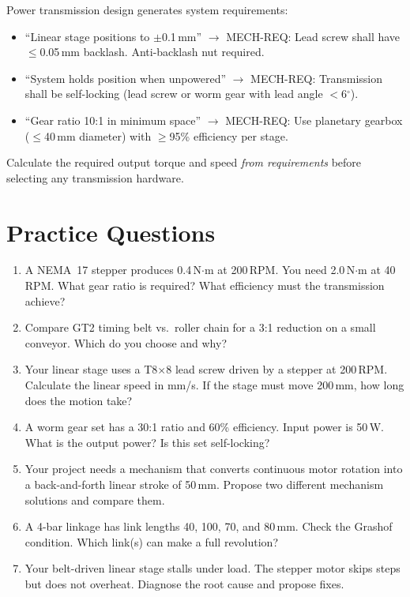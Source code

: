 \documentclass[11pt,letterpaper,twoside,openany]{book}
\providecommand{\ang}[1]{#1\ensuremath{{}^{\circ}}}
\begin{document}
\begin{keyconceptbox}
Power transmission design generates system requirements:
\begin{itemize}[nosep,leftmargin=1.5em]
\item ``Linear stage positions to $\pm$0.1\,mm'' $\to$ MECH-REQ: Lead screw shall have $\leq$0.05\,mm backlash. Anti-backlash nut required.
\item ``System holds position when unpowered'' $\to$ MECH-REQ: Transmission shall be self-locking (lead screw or worm gear with lead angle $<$\ang{6}).
\item ``Gear ratio 10:1 in minimum space'' $\to$ MECH-REQ: Use planetary gearbox ($\leq$40\,mm diameter) with $\geq$95\% efficiency per stage.
\end{itemize}
Calculate the required output torque and speed \emph{from requirements} before selecting any transmission hardware.
\end{keyconceptbox}

\section{Practice Questions}
\begin{enumerate}[leftmargin=1.5em]
\item A NEMA~17 stepper produces 0.4\,N$\cdot$m at 200\,RPM. You need 2.0\,N$\cdot$m at 40\,RPM. What gear ratio is required? What efficiency must the transmission achieve?
\item Compare GT2 timing belt vs.\ roller chain for a 3:1 reduction on a small conveyor. Which do you choose and why?
\item Your linear stage uses a T8$\times$8 lead screw driven by a stepper at 200\,RPM. Calculate the linear speed in mm/s. If the stage must move 200\,mm, how long does the motion take?
\item A worm gear set has a 30:1 ratio and 60\% efficiency. Input power is 50\,W. What is the output power? Is this set self-locking?
\item Your project needs a mechanism that converts continuous motor rotation into a back-and-forth linear stroke of 50\,mm. Propose two different mechanism solutions and compare them.
\item A 4-bar linkage has link lengths 40, 100, 70, and 80\,mm. Check the Grashof condition. Which link(s) can make a full revolution?
\item Your belt-driven linear stage stalls under load. The stepper motor skips steps but does not overheat. Diagnose the root cause and propose fixes.
\end{enumerate}
\end{document}
